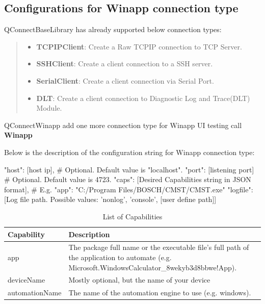 \hypertarget{connect}{%
\subsection{\texorpdfstring{\textbf{Configurations for Winapp connection type}}{connect}}\label{connect}}

QConnectBaseLibrary has already
supported below connection types:

\begin{quote}
\begin{itemize}
\tightlist
\item
  \textbf{TCPIPClient}: Create a Raw TCPIP connection to TCP Server.
\item
  \textbf{SSHClient}: Create a client connection to a SSH server.
\item
  \textbf{SerialClient}: Create a client connection via Serial Port.
\item
  \textbf{DLT}: Create a client connection to Diagnostic Log and Trace(DLT) Module.
\end{itemize}
\end{quote}

QConnectWinapp add one more connection type for Winapp UI testing call \textbf{Winapp}


Below is the description of the configuration string for Winapp connection type:


\begin{robotcode}
{
    "host": [host ip],     # Optional. Default value is "localhost".
    "port": [listening port]  # Optional. Default value is 4723.
    "caps": [Desired Capabilities string in JSON format],  # E.g. { "app": "C:/Program Files/BOSCH/CMST/CMST.exe"}
    "logfile": [Log file path. Possible values: 'nonlog', 'console', [user define path]]
}
\end{robotcode}

\begin{table}[h]
\centering
\caption{List of Capabilities}
\begin{tabular}{|p{3cm}|p{9cm}|}
\hline
\textbf{Capability} & \textbf{Description} \\
\hline
app & The package full name or the executable file's full path of the application to automate (e.g. Microsoft.WindowsCalculator\_8wekyb3d8bbwe!App). \\
\hline
deviceName & Mostly optional, but the name of your device \\
\hline
automationName & The name of the automation engine to use (e.g. windows). \\
\hline
\end{tabular}
\end{table}


